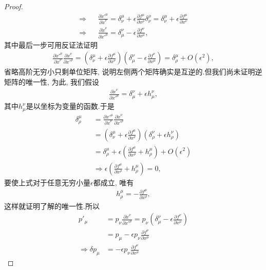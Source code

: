 \begin{proof}
\begin{eqnarray*}
			\Rightarrow&&\frac{\partial \dot{x}'^\mu}{\partial \dot{x}^\nu}=\delta^\mu_\nu+\epsilon \frac{\partial f^\mu}{\partial x^\rho}\delta^\rho_\nu=\delta^\mu_\nu+\epsilon \frac{\partial f^\mu}{\partial x^\nu}\\
			\Rightarrow&&\frac{\partial \dot{x}^\nu}{\partial \dot{x}'^\mu}=\delta^\nu_\mu-\epsilon \frac{\partial f^\nu}{\partial x^\mu},
		\end{eqnarray*}
		其中最后一步可用反证法证明
		\begin{eqnarray*}
			\frac{\partial \dot{x}'^\mu}{\partial \dot{x}^\nu}\frac{\partial \dot{x}^\nu}{\partial \dot{x}'^\rho}=\left(\delta^\mu_\nu+\epsilon \frac{\partial f^\mu}{\partial x^\nu}\right)\left(\delta^\nu_\mu-\epsilon \frac{\partial f^\nu}{\partial x^\mu}\right)=\delta^\mu_\rho+O(\epsilon^2),
		\end{eqnarray*}
		省略高阶无穷小只剩单位矩阵, 说明左侧两个矩阵确实是互逆的.但我们尚未证明逆矩阵的唯一性, 为此, 我们假设
		\begin{eqnarray*}
			\frac{\partial \dot{x}^\nu}{\partial \dot{x}'^\mu}=\delta^\nu_\mu+\epsilon h^\nu_\mu,
		\end{eqnarray*}
		其中$h^\nu_\mu$是以坐标为变量的函数.于是
		\begin{eqnarray*}
			\delta^\mu_\rho&&=\frac{\partial \dot{x}'^\mu}{\partial \dot{x}^\nu}\frac{\partial \dot{x}^\nu}{\partial \dot{x}'^\rho}\\
			&&=\left(\delta^\mu_\nu+\epsilon \frac{\partial f^\mu}{\partial x^\nu}\right)\left(\delta^\nu_\rho+\epsilon h^\nu_\rho\right)\\
			&&=\delta^\mu_\rho+\epsilon\left(\frac{\partial f^\mu}{\partial x^\rho}+h^\mu_\rho\right)+O(\epsilon^2)\\
			&&\Rightarrow\epsilon\left(\frac{\partial f^\mu}{\partial x^\rho}+h^\mu_\rho\right)=0,
		\end{eqnarray*}
		要使上式对于任意无穷小量$\epsilon$都成立, 唯有
		\begin{eqnarray*}
			h^\mu_\rho=-\frac{\partial f^\mu}{\partial x^\rho},
		\end{eqnarray*}
		这样就证明了解的唯一性.所以
		\begin{equation}\label{pr:delta p}
		\begin{split}
			p'_\mu&=p_\nu\frac{\partial \dot{x}^\nu}{\partial \dot{x}'^\mu}=p_\nu\left(\delta^\nu_\mu-\epsilon \frac{\partial f^\nu}{\partial x^\mu}\right)\\
			&=p_\mu-\epsilon p_\nu\frac{\partial f^\nu}{\partial x^\mu}\\
			\Rightarrow\delta p_\mu&=-\epsilon p_\nu\frac{\partial f^\nu}{\partial x^\mu}

\end{split}
\end{equation}
\end{proof}
